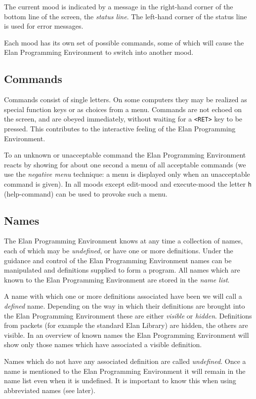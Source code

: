 \noindent
The current mood is indicated by a message in the right-hand
corner of the bottom line of the screen, the {\em status line}.
The left-hand corner of the status line is used for error messages.

Each mood has its own set of possible commands, some of which
will cause the Elan Programming Environment to switch into another
mood.

\subsection{Commands}

Commands consist of single letters. On some computers they may
be realized as special function keys or as choices from a menu.
Commands are not echoed on the screen, and are obeyed immediately,
without waiting for a {\tt <RET>} key to be pressed. This contributes
to the interactive feeling of the Elan Programming Environment.

To an unknown or unacceptable command the Elan Programming Environment
reacts by showing for about one second a menu of all acceptable
commands (we use the {\em negative menu} technique: a menu is
displayed only when an unacceptable command is given). In all
moods except edit-mood and execute-mood the letter {\tt h }(help-command)
can be used to provoke such a menu.

\subsection{Names}

The Elan Programming Environment knows at any time a collection
of names, each of which may be {\em undefined}, or have one or more
definitions. Under the guidance and control of the Elan Programming
Environment names can be manipulated and definitions supplied
to form a program. All names which are known to the Elan Programming
Environment are stored in the {\em name list}.

A name with which one or more definitions associated have been
we will call a {\em defined} name. Depending on the way in which
their definitions are brought into the Elan Programming Environment
these are either {\em visible} or {\em hidden}. Definitions from
packets (for example the standard Elan Library) are hidden, the
others are visible. In an overview of known names the Elan Programming
Environment will show only those names which have associated
a visible definition.

Names which do not have any associated definition are called
{\em undefined}. Once a name is mentioned to the Elan Programming
Environment it will remain in the name list even when it is undefined.
It is important to know this when using abbreviated names (see
later). 

